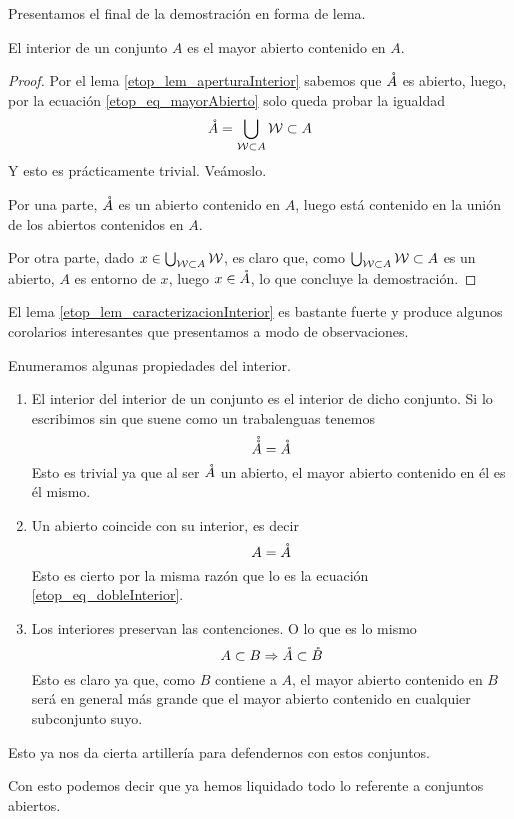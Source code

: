 Presentamos el final de la demostración en forma de lema.
\begin{lem}
	\label{etop_lem_caracterizacionInterior}
	El interior de un conjunto $A$ es el mayor abierto contenido en $A$.
\end{lem}
\begin{proof}
	Por el lema \ref{etop_lem_aperturaInterior} sabemos que $\mathring{A}$ es abierto, luego, por la ecuación \eqref{etop_eq_mayorAbierto} solo queda probar la igualdad
	\begin{equation*}
		\mathring{A}=\bigcup_{\mathcal{W}\subset A}\mathcal{W}\subset A
	\end{equation*}
	Y esto es prácticamente trivial. Veámoslo.
	
	Por una parte, $\mathring{A}$ es un abierto contenido en $A$, luego está contenido en la unión de los abiertos contenidos en $A$.
	
	Por otra parte, dado $x\in\bigcup_{\mathcal{W}\subset A}\mathcal{W}$, es claro que, como $\bigcup_{\mathcal{W}\subset A}\mathcal{W}\subset A$ es un abierto, $A$ es entorno de $x$, luego $x\in\mathring{A}$, lo que concluye la demostración.
\end{proof}

El lema \ref{etop_lem_caracterizacionInterior} es bastante fuerte y produce algunos corolarios interesantes que presentamos a modo de observaciones.
\begin{obs}
	\label{etop_obs_propiedadesInterior}
	Enumeramos algunas propiedades del interior.
	\begin{enumerate}
		\item El interior del interior de un conjunto es el interior de dicho conjunto. Si lo escribimos sin que suene como un trabalenguas tenemos
		\begin{equation}
		\label{etop_eq_dobleInterior}
			\mathring{\mathring{A}}=\mathring{A}
		\end{equation}
		Esto es trivial ya que al ser $\mathring{A}$ un abierto, el mayor abierto contenido en él es él mismo.
		\item Un abierto coincide con su interior, es decir
		\begin{equation}
			\label{etop_eq_abiertoInterior}
			A=\mathring{A}
		\end{equation}
		Esto es cierto por la misma razón que lo es la ecuación \eqref{etop_eq_dobleInterior}.
		\item Los interiores preservan las contenciones. O lo que es lo mismo
		\begin{equation}
			\label{etop_eq_interiorContencion}
			A\subset B\Rightarrow \mathring{A}\subset\mathring{B}
		\end{equation}
		Esto es claro ya que, como $B$ contiene a $A$, el mayor abierto contenido en $B$ será en general más grande que el mayor abierto contenido en cualquier subconjunto suyo.
	\end{enumerate}
	Esto ya nos da cierta artillería para defendernos con estos conjuntos.
\end{obs}
Con esto podemos decir que ya hemos liquidado todo lo referente a conjuntos abiertos.
